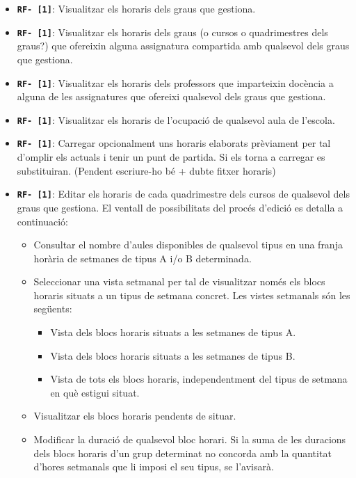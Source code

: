 \documentclass[a4paper,12pt]{ThesisStyle}
\begin{document}
\begin{itemize}
  \item \texttt{\textbf{RF- [1]}}: Visualitzar els horaris dels graus que gestiona.
  \item \texttt{\textbf{RF- [1]}}: Visualitzar els horaris dels graus (o cursos o quadrimestres dels graus?) que ofereixin alguna assignatura compartida amb qualsevol dels graus que gestiona.
  \item \texttt{\textbf{RF- [1]}}: Visualitzar els horaris dels professors que imparteixin docència a alguna de les assignatures que ofereixi qualsevol dels graus que gestiona.
  \item \texttt{\textbf{RF- [1]}}: Visualitzar els horaris de l'ocupació de qualsevol aula de l'escola.
  \item \texttt{\textbf{RF- [1]}}: Carregar opcionalment uns horaris elaborats prèviament per tal d'omplir els actuals i tenir un punt de partida. Si els torna a carregar es substituiran. (Pendent escriure-ho bé + dubte fitxer horaris)
  \item \texttt{\textbf{RF- [1]}}: Editar els horaris de cada quadrimestre dels cursos de qualsevol dels graus que gestiona. El ventall de possibilitats del procés d'edició es detalla a continuació:
    \begin{itemize}
      \item Consultar el nombre d'aules disponibles de qualsevol tipus en una franja horària de setmanes de tipus A i/o B determinada.
      \item Seleccionar una vista setmanal per tal de visualitzar només els blocs horaris situats a un tipus de setmana concret. Les vistes setmanals són les següents:
        \begin{itemize}
          \item Vista dels blocs horaris situats a les setmanes de tipus A.
          \item Vista dels blocs horaris situats a les setmanes de tipus B.
          \item Vista de tots els blocs horaris, independentment del tipus de setmana en què estigui situat.
        \end{itemize}
      \item Visualitzar els blocs horaris pendents de situar.
      
      \item Modificar la duració de qualsevol bloc horari. Si la suma de les duracions dels blocs horaris d'un grup determinat no concorda amb la quantitat d'hores setmanals que li imposi el seu tipus, se l'avisarà.
      

\end{itemize}
\end{itemize}
\end{document}
